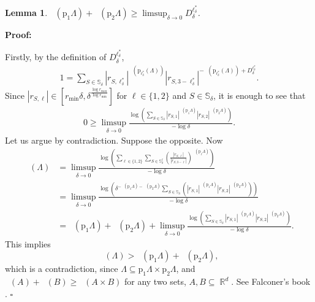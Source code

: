 \documentclass[a4paper, 11pt]{article}
\newenvironment{Proof}{\noindent \textbf{Proof:}}{\hfill$\square$\\}
\DeclareMathOperator{\R}{\mathbb{R}}
\DeclareMathOperator{\dB}{\dim_{\mathrm{B}}}
\DeclareMathOperator{\dUB}{\overline{\dim}_{\mathrm{B}}}
\numberwithin{equation}{section}
\theoremstyle{plain}
\newtheorem{lemma}[theorem]{Lemma}
\theoremstyle{remark}
\theoremstyle{definition}
\begin{document}
\begin{lemma}\label{lem:tech}
	$\dB(\mathrm{p}_1\Lambda)+\dB(\mathrm{p}_2\Lambda)\geq \limsup_{\delta \to 0}D_\delta^{\ell_\delta^*}$.
\end{lemma}
\begin{Proof} 

Firstly, by the definition of $D_\delta^{\ell_\delta^*}$,
	\begin{align*}
		1 = \sum_{S \in \mathbb{S}_\delta} |r_{S,{\ell_\delta^*}}|^{\dB(\mathrm{p}_{\ell_\delta^*}(\Lambda))} |r_{S,3-{\ell_\delta^*}}|^{-\dB(\mathrm{p}_{\ell_\delta^*}(\Lambda))+D_\delta^{\ell_\delta^*}}.
	\end{align*}
Since $|r_{S,\ell}|\in\left[r_{\min}\delta,\delta^{\frac{\log r_{\max}}{\log r_{\min}}}\right]$ for $\ell \in \{1,2\}$ and $S\in\mathbb{S}_{\delta}$, it is enough to see that
	\begin{align} \label{eq:bpn1}
		0 \geq \limsup_{\delta\to0}\frac{\log\left( \sum_{S \in \mathbb{S}_\delta} |r_{S,1}|^{\dB(\mathrm{p}_1\Lambda)} |r_{S,2}|^{\dB(\mathrm{p}_2\Lambda)} \right)}{-\log\delta}.
	\end{align}
	Let us argue by contradiction. Suppose the opposite. Now
	\begin{align*}
		\dB(\Lambda) &= \limsup_{\delta \to 0} \frac{\log \left(\sum_{\ell \in \{1,2\}} \sum_{S \in \mathbb{S}_\delta^\ell} \left(\frac{|r_{S,\ell}|}{|r_{S,3-\ell}|}\right)^{\dB(\mathrm{p}_\ell\Lambda)}\right)}{-\log\delta} \\
		&= \limsup_{\delta \to 0} \frac{\log \left(\delta^{-\dB(\mathrm{p}_1\Lambda) - \dB(\mathrm{p}_2\Lambda)}\sum_{S \in \mathbb{S}_\delta} \left(|r_{S,1}|^{\dB(\mathrm{p}_1\Lambda)} |r_{S,2}|^{\dB(\mathrm{p}_2\Lambda)}\right)\right)}{-\log \delta}\\
		&= \dB(\mathrm{p}_1\Lambda) + \dB(\mathrm{p}_2\Lambda) + \limsup_{\delta \to 0} \frac{\log \left(\sum_{S \in \mathbb{S}_\delta} |r_{S,1}|^{\dB(\mathrm{p}_1\Lambda)} |r_{S,2}|^{\dB(\mathrm{p}_2\Lambda)}\right)}{-\log \delta}.
\end{align*}
This implies
\[ \dB(\Lambda) > \dB(\mathrm{p}_1\Lambda) + \dB(\mathrm{p}_2\Lambda),\]
which is a contradiction, since $\Lambda \subseteq \mathrm{p}_1\Lambda \times \mathrm{p}_2\Lambda$, and $
\dB(A)+\dB(B) \geq \dUB(A\times B)$ for any two sets, $A, B \subseteq \R^d$. See Falconer’s book \cite{Falconer1990}.
\end{Proof}
	
\end{document}
